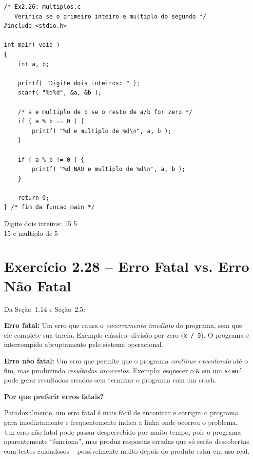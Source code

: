 \documentclass[12pt,a4paper]{article}
\begin{document}
\begin{respostabox}[title={Exercício 2.26 -- Verificar se o primeiro é múltiplo do segundo}]
\begin{lstlisting}
/* Ex2.26: multiplos.c
   Verifica se o primeiro inteiro e multiplo do segundo */
#include <stdio.h>

int main( void )
{
    int a, b;

    printf( "Digite dois inteiros: " );
    scanf( "%d%d", &a, &b );

    /* a e multiplo de b se o resto de a/b for zero */
    if ( a % b == 0 ) {
        printf( "%d e multiplo de %d\n", a, b );
    }

    if ( a % b != 0 ) {
        printf( "%d NAO e multiplo de %d\n", a, b );
    }

    return 0;
} /* fim da funcao main */
\end{lstlisting}

\begin{saida}
Digite dois inteiros: 15 5\\
15 e multiplo de 5
\end{saida}
\end{respostabox}

\section{Exercício 2.28 -- Erro Fatal vs. Erro Não Fatal}

\begin{respostabox}[title={Exercício 2.28 -- Distinguindo erros fatais de não fatais}]

Da Seção~1.14 e Seção~2.5:

\textbf{Erro fatal:} Um erro que causa o \textit{encerramento imediato} do programa, sem
que ele complete sua tarefa. Exemplo clássico: divisão por zero (\texttt{x / 0}).
O programa é interrompido abruptamente pelo sistema operacional.

\textbf{Erro não fatal:} Um erro que permite que o programa \textit{continue executando}
até o fim, mas produzindo \textit{resultados incorretos}. Exemplo: esquecer o \texttt{\&}
em um \texttt{scanf} pode gerar resultados errados sem terminar o programa com um crash.

\textbf{Por que preferir erros fatais?}

Paradoxalmente, um erro fatal é mais fácil de encontrar e corrigir: o programa para
imediatamente e frequentemente indica a linha onde ocorreu o problema. Um erro não fatal
pode passar despercebido por muito tempo, pois o programa aparentemente ``funciona'', mas
produz respostas erradas que só serão descobertas com testes cuidadosos -- possivelmente
muito depois do produto estar em uso real.
\end{respostabox}
\end{document}
